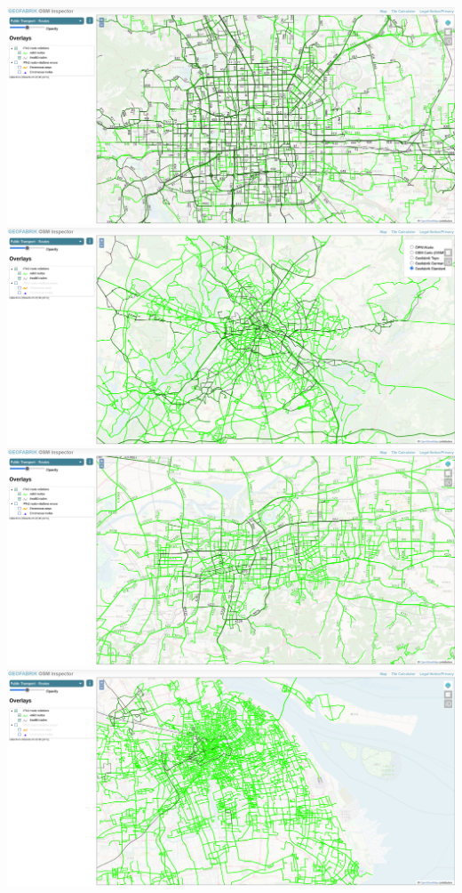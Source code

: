 \documentclass{beamer}
\begin{document}
\begin{frame}
    \begin{columns}
        \includegraphics[width=1\linewidth]{figure/ptv2-beijing.png}
        \vspace{1em}
        \includegraphics[width=1\linewidth]{figure/ptv2-berlin.png}
        \includegraphics[width=1\linewidth]{figure/ptv2-jinan.png}
        \vspace{1em}
        \includegraphics[width=1\linewidth]{figure/ptv2-shanghai.png}
    \end{columns}
\end{frame}
\end{document}
